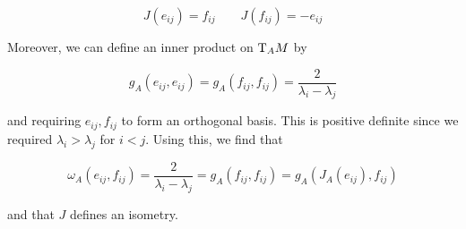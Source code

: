 \documentclass{report}
\begin{document}
\[J(e_{ij}) = f_{ij} \qquad J(f_{ij}) = -e_{ij}\]




Moreover, we can define an inner product on \(\mathrm{T}_AM\) by

\[g_A(e_{ij}, e_{ij}) = g_A(f_{ij}, f_{ij}) = \frac{2}{\lambda_i - \lambda_j}\]

and requiring \(e_{ij}, f_{ij}\) to form an orthogonal basis. This is positive definite since we required \(\lambda_i > \lambda_j\) for \(i < j\). Using this, we find that

\[\omega_A(e_{ij}, f_{ij}) = \frac{2}{\lambda_i - \lambda_j} = g_A(f_{ij}, f_{ij}) = g_A(J_A(e_{ij}), f_{ij})\]

and that \(J\) defines an isometry.
\end{document}
